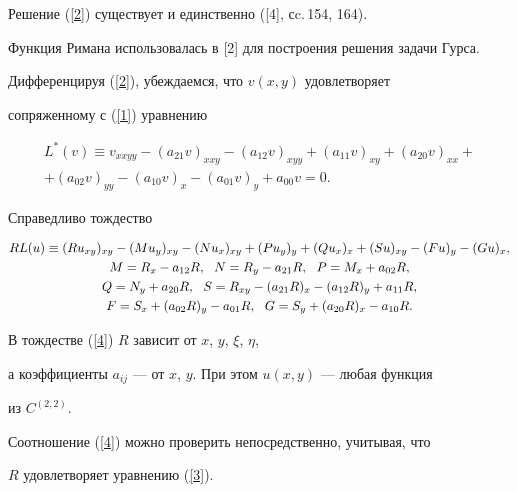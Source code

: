 Решение (\ref{2}) существует и единственно ([4], сc.\,154, 164).


Функция Римана использовалась в [2] для построения решения задачи Гурса.





Дифференцируя (\ref{2}), убеждаемся, что $v(x,y)$ удовлетворяет


сопряженному с (\ref{1}) уравнению


\begin{multline}\label{3}


L^{*}(v)\equiv v_{xxyy}-(a_{21}v)_{xxy}-(a_{12}v)_{xyy}+(a_{11}v)_{xy}+


(a_{20}v)_{xx}+\\


+(a_{02}v)_{yy}-(a_{10}v)_{x}-(a_{01}v)_{y}+a_{00}v=0.


\end{multline}





Справедливо тождество


\begin{gather}\label{4}


RL(u)\equiv(Ru_{xy})_{xy}-(Mu_y)_{xy}-(Nu_x)_{xy}+(Pu_y)_{y}+


(Qu_x)_{x}+(Su)_{xy}-(Fu)_{y}-(Gu)_{x},\\


%


M=R_{x}-a_{12}R,\ \ N=R_{y}-a_{21}R,\ \ 


P=M_{x}+a_{02}R,\notag \\


Q=N_{y}+a_{20}R,\ \  S=R_{xy}-(a_{21}R)_{x}-(a_{12}R)_{y}+a_{11}R,\notag\\


F=S_{x}+(a_{02}R)_{y}-a_{01}R,\ \ G=S_{y}+(a_{20}R)_{x}-a_{10}R.\notag


\end{gather}


В тождестве (\ref{4}) $R$ зависит от $x$, $y$, $\xi$, $\eta$,


а коэффициенты $a_{ij}$ --- от $x$, $y$. При этом $u(x,y)$ --- любая функция


из $C^{(2,2)}$.


Соотношение (\ref{4}) можно проверить непосредственно, учитывая, что


$R$ удовлетворяет уравнению (\ref{3}).





